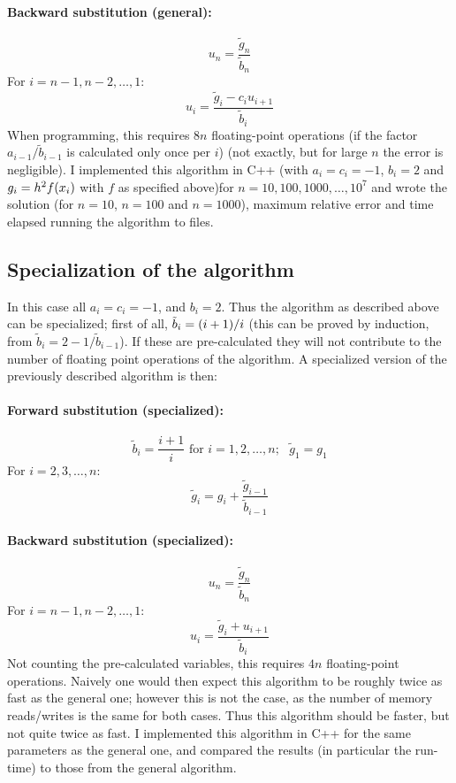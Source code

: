 \documentclass[a4paper,english]{article}
\let\originalleft\left
\let\originalright\right
\renewcommand{\left}{\mathopen{}\mathclose\bgroup\originalleft}
\renewcommand{\right}{\aftergroup\egroup\originalright}
\begin{document}
\paragraph{Backward substitution (general):}
\begin{equation}
  u_n = \frac{\tilde{g}_n}{\tilde{b}_n}
\end{equation}
For $i = n-1, n-2, \dots, 1$:
\begin{equation}
  u_i = \frac{\tilde{g}_i-c_iu_{i+1}}{\tilde{b}_i}
\end{equation}
When programming, this requires $8n$ floating-point operations (if the factor $a_{i-1}/\tilde{b}_{i-1}$ is calculated only once per $i$) (not exactly, but for large $n$ the error is negligible). I implemented this algorithm in C++ (with $a_i = c_i = -1$, $b_i = 2$ and $g_i = h^2f\left(x_i\right)$ with $f$ as specified above)for $n = 10,100,1000,\dots,10^7$ and wrote the solution (for $n=10$, $n=100$ and $n=1000$), maximum relative error and time elapsed running the algorithm to files.
\subsection{Specialization of the algorithm}
In this case all $a_i = c_i = -1$, and $b_i = 2$. Thus the algorithm as described above can be specialized; first of all, $\tilde{b}_i = \left(i+1\right)/i$ (this can be proved by induction, from $\tilde{b}_i = 2-1/\tilde{b}_{i-1}$). If these are pre-calculated they will not contribute to the number of floating point operations of the algorithm. A specialized version of the previously described algorithm is then:
\paragraph{Forward substitution (specialized):}
\begin{equation}
  \tilde{b}_i = \frac{i+1}{i} \text{ for }i=1,2,\dots,n;\text{ }\tilde{g}_1 = g_1
\end{equation}
For $i = 2,3,\dots,n$:
\begin{equation}
  \tilde{g}_i = g_i+\frac{\tilde{g}_{i-1}}{\tilde{b}_{i-1}}
\end{equation}
\paragraph{Backward substitution (specialized):}
\begin{equation}
  u_n = \frac{\tilde{g}_n}{\tilde{b}_n}
\end{equation}
For $i = n-1, n-2, \dots, 1$:
\begin{equation}
  u_i = \frac{\tilde{g}_i+u_{i+1}}{\tilde{b}_i}
\end{equation}
Not counting the pre-calculated variables, this requires $4n$ floating-point operations. Naively one would then expect this algorithm to be roughly twice as fast as the general one; however this is not the case, as the number of memory reads/writes is the same for both cases. Thus this algorithm should be faster, but not quite twice as fast. I implemented this algorithm in C++ for the same parameters as the general one, and compared the results (in particular the run-time) to those from the general algorithm.
\end{document}
